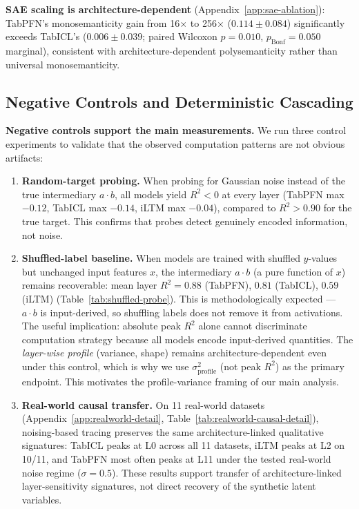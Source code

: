 \documentclass{article}
\begin{document}
\textbf{SAE scaling is architecture-dependent} (Appendix~\ref{app:sae-ablation}): TabPFN's monosemanticity gain from 16$\times$ to 256$\times$ ($0.114 \pm 0.084$) significantly exceeds TabICL's ($0.006 \pm 0.039$; paired Wilcoxon $p = 0.010$, $p_\text{Bonf} = 0.050$ marginal), consistent with architecture-dependent polysemanticity rather than universal monosemanticity.


\subsection{Negative Controls and Deterministic Cascading}
\label{sec:controls}

\textbf{Negative controls support the main measurements.} We run three control experiments to validate that the observed computation patterns are not obvious artifacts:

\begin{enumerate}
  \item \textbf{Random-target probing.} When probing for Gaussian noise instead of the true intermediary $a \cdot b$, all models yield $R^2 < 0$ at every layer (TabPFN max $-0.12$, TabICL max $-0.14$, iLTM max $-0.04$), compared to $R^2 > 0.90$ for the true target. This confirms that probes detect genuinely encoded information, not noise.
  \item \textbf{Shuffled-label baseline.} When models are trained with shuffled $y$-values but unchanged input features $x$, the intermediary $a \cdot b$ (a pure function of $x$) remains recoverable: mean layer $R^2 = 0.88$ (TabPFN), $0.81$ (TabICL), $0.59$ (iLTM) (Table~\ref{tab:shuffled-probe}). This is methodologically expected --- $a \cdot b$ is input-derived, so shuffling labels does not remove it from activations. The useful implication: absolute peak $R^2$ alone cannot discriminate computation strategy because all models encode input-derived quantities. The \textit{layer-wise profile} (variance, shape) remains architecture-dependent even under this control, which is why we use $\sigma^2_\text{profile}$ (not peak $R^2$) as the primary endpoint. This motivates the profile-variance framing of our main analysis.
\item \textbf{Real-world causal transfer.} On 11 real-world datasets (Appendix~\ref{app:realworld-detail}, Table~\ref{tab:realworld-causal-detail}), noising-based tracing preserves the same architecture-linked qualitative signatures: TabICL peaks at L0 across all 11 datasets, iLTM peaks at L2 on 10/11, and TabPFN most often peaks at L11 under the tested real-world noise regime ($\sigma = 0.5$). These results support transfer of architecture-linked layer-sensitivity signatures, not direct recovery of the synthetic latent variables.
\end{enumerate}
\end{document}
